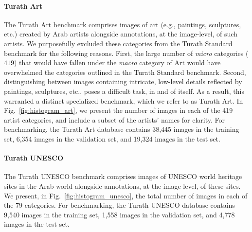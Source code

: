 \documentclass{article}
\begin{document}
\paragraph{Turath Art} 

The Turath Art benchmark comprises images of art (e.g., paintings, sculptures, etc.) created by Arab artists alongside annotations, at the image-level, of such artists. We purposefully excluded these categories from the Turath Standard benchmark for the following reasons. First, the large number of \textit{micro} categories ($419$) that would have fallen under the \textit{macro} category of $\mathrm{Art}$ would have overwhelmed the categories outlined in the Turath Standard benchmark. Second, distinguishing between images containing intricate, low-level details reflected by paintings, sculptures, etc., poses a difficult task, in and of itself. As a result, this warranted a distinct specialized benchmark, which we refer to as Turath Art. In Fig.~\ref{fig:histogram_art}, we present the number of images in each of the 419 artist categories, and include a subset of the artists' names for clarity. For benchmarking, the Turath Art database contains 38,445 images in the training set, 6,354 images in the validation set, and 19,324 images in the test set.

\paragraph{Turath UNESCO}

The Turath UNESCO benchmark comprises images of UNESCO world heritage sites in the Arab world alongside annotations, at the image-level, of these sites. We present, in Fig.~\ref{fig:histogram_unesco}, the total number of images in each of the 79 categories. For benchmarking, the Turath UNESCO database contains 9,540 images in the training set, 1,558 images in the validation set, and 4,778 images in the test set.

\end{document}
